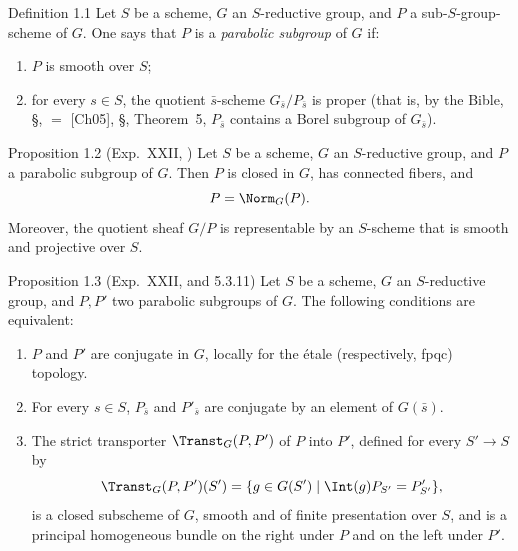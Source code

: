 \begin{sgastatement}{Definition 1.1}
Let \(S\) be a scheme, \(G\) an \(S\)-reductive group, and \(P\) a
sub-\(S\)-group-scheme of \(G\).  One says that \(P\) is a
\emph{parabolic subgroup} of \(G\) if:
\begin{enumerate}[label=\textup{(\roman*)}]
\item \(P\) is smooth over \(S\);
\item for every \(s\in S\), the quotient \(\bar s\)-scheme
\(G_{\bar s}/P_{\bar s}\) is proper (that is, by the Bible, §,
 \(=\) [Ch05], §, Theorem~5, \(P_{\bar s}\) contains a
Borel subgroup of \(G_{\bar s}\)).
\end{enumerate}
\end{sgastatement}

\begin{sgastatement}{Proposition 1.2 \textup{(Exp.\ XXII, )}}
Let \(S\) be a scheme, \(G\) an \(S\)-reductive group, and \(P\) a parabolic
subgroup of \(G\).  Then \(P\) is closed in \(G\), has connected fibers, and
\[
  P=\Norm_G(P).
\]
Moreover, the quotient sheaf \(G/P\) is representable by an \(S\)-scheme
that is smooth and projective over \(S\).
\end{sgastatement}

\begin{sgastatement}{Proposition 1.3 \textup{(Exp.\ XXII,  and 5.3.11)}}
Let \(S\) be a scheme, \(G\) an \(S\)-reductive group, and \(P,P'\) two
parabolic subgroups of \(G\).  The following conditions are equivalent:
\begin{enumerate}[label=\textup{(\roman*)}]
\item \(P\) and \(P'\) are conjugate in \(G\), locally for the étale
\textup{(respectively, fpqc)} topology.
\item For every \(s\in S\), \(P_{\bar s}\) and \(P'_{\bar s}\) are conjugate
by an element of \(G(\bar s)\).
\item The strict transporter \(\Transt_G(P,P')\) of \(P\) into \(P'\), defined
for every \(S'\to S\) by
\[
 \Transt_G(P,P')(S')
 =\{g\in G(S')\mid \Int(g)P_{S'}=P'_{S'}\},
\]
is a closed subscheme of \(G\), smooth and of finite presentation over
\(S\), and is a principal homogeneous bundle on the right under \(P\) and
on the left under \(P'\).
\end{enumerate}
\end{sgastatement}

